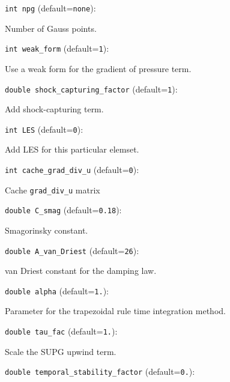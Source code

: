 \item\verb+int npg+ {\rm(default=\verb|none|)}:

Number of Gauss points.
\item\verb+int weak_form+ {\rm(default=\verb|1|)}:

Use a weak form for the gradient of pressure term.
\item\verb+double shock_capturing_factor+ {\rm(default=\verb|1|)}:

Add shock-capturing term.
\item\verb+int LES+ {\rm(default=\verb|0|)}:

Add LES for this particular elemset.
\item\verb+int cache_grad_div_u+ {\rm(default=\verb|0|)}:

Cache \verb+grad_div_u+ matrix
\item\verb+double C_smag+ {\rm(default=\verb|0.18|)}:

Smagorinsky constant.
\item\verb+double A_van_Driest+ {\rm(default=\verb|26|)}:

van Driest constant for the damping law.
\item\verb+double alpha+ {\rm(default=\verb|1.|)}:

Parameter for the trapezoidal rule time integration method. 
\item\verb+double tau_fac+ {\rm(default=\verb|1.|)}:

Scale the SUPG upwind term. 
\item\verb+double temporal_stability_factor+ {\rm(default=\verb|0.|)}:

